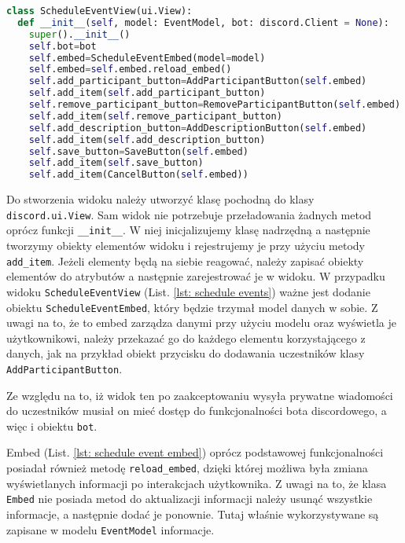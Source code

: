 \documentclass[11pt,a4paper]{article}
\newcommand{\classname}[1]{\texttt{#1}}
\begin{document}
\begin{lstlisting}[language=Python,caption={Klasa ScheduleEventView},label={lst: schedule events}]
class ScheduleEventView(ui.View):
  def __init__(self, model: EventModel, bot: discord.Client = None):
    super().__init__()
    self.bot=bot
    self.embed=ScheduleEventEmbed(model=model)
    self.embed=self.embed.reload_embed()
    self.add_participant_button=AddParticipantButton(self.embed)
    self.add_item(self.add_participant_button)
    self.remove_participant_button=RemoveParticipantButton(self.embed)
    self.add_item(self.remove_participant_button)
    self.add_description_button=AddDescriptionButton(self.embed)
    self.add_item(self.add_description_button)
    self.save_button=SaveButton(self.embed)
    self.add_item(self.save_button)
    self.add_item(CancelButton(self.embed))
\end{lstlisting}

Do stworzenia widoku należy utworzyć klasę pochodną do klasy \classname{discord.ui.View}. Sam widok nie potrzebuje przeładowania żadnych metod oprócz funkcji \classname{\_\_init\_\_}. W niej inicjalizujemy klasę nadrzędną a następnie tworzymy obiekty elementów widoku i rejestrujemy je przy użyciu metody \classname{add\_item}. Jeżeli elementy będą na siebie reagować, należy zapisać obiekty elementów do atrybutów a następnie zarejestrować je w widoku. W przypadku widoku \classname{ScheduleEventView} (List. \ref{lst: schedule events}) ważne jest dodanie obiektu \classname{ScheduleEventEmbed}, który będzie trzymał model danych w sobie. Z uwagi na to, że to embed zarządza danymi przy użyciu modelu oraz wyświetla je użytkownikowi, należy przekazać go do każdego elementu korzystającego z danych, jak na przykład obiekt przycisku do dodawania uczestników klasy \classname{AddParticipantButton}.

Ze względu na to, iż widok ten po zaakceptowaniu wysyła prywatne wiadomości do uczestników musiał on mieć dostęp do funkcjonalności bota discordowego, a więc i obiektu \classname{bot}.

Embed (List. \ref{lst: schedule event embed}) oprócz podstawowej funkcjonalności posiadał również metodę \classname{reload\_embed}, dzięki której możliwa była zmiana wyświetlanych informacji po interakcjach użytkownika. Z uwagi na to, że klasa \classname{Embed} nie posiada metod do aktualizacji informacji \cite{EmbedDocumentation} należy usunąć wszystkie informacje, a następnie dodać je ponownie. Tutaj właśnie wykorzystywane są zapisane w modelu \classname{EventModel} informacje. 
\end{document}
